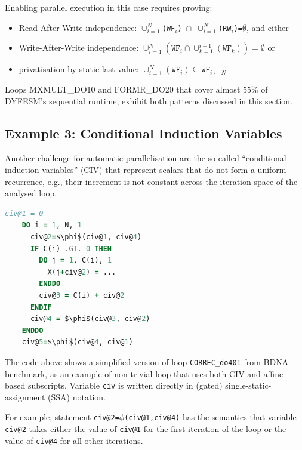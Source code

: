 Enabling parallel execution in this case requires proving:
\begin{itemize}
\item Read-After-Write independence: \texttt{$\cup_{i=1}^N$(WF$_i$)
    $\cap$ $\cup_{i=1}^{N}$(RW$_i$)=$\emptyset$}, and either
\item Write-After-Write independence:
  $\cup_{i=1}^{N}(\texttt{WF}_i \cap \cup_{k=1}^{i-1}(\texttt{WF}_k))=\emptyset$ or
\item privatisation by static-last value:
  $\cup_{i=1}^{N}(\texttt{WF}_i) \subseteq\texttt{WF}_{i\leftarrow N}$
\end{itemize}

Loops MXMULT\_DO10 and FORMR\_DO20 that cover almost $55\%$ of
DYFESM's sequential runtime, exhibit both patterns discussed in this
section.

\subsection{Example 3: Conditional Induction Variables}
\label{subsec:eg3}

Another challenge for automatic parallelisation are the so called
``conditional-induction variables'' (CIV) that represent scalars that
do not form a uniform recurrence, e.g., their increment is not
constant across the iteration space of the analysed loop.

\begin{lstlisting}[language=fortran,mathescape=true,escapechar=|]
    civ@1 = 0
    DO i = 1, N, 1
      civ@2=$\phi$(civ@1, civ@4)
      IF C(i) .GT. 0 THEN
        DO j = 1, C(i), 1
          X(j+civ@2) = ...
        ENDDO
        civ@3 = C(i) + civ@2
      ENDIF
      civ@4 = $\phi$(civ@3, civ@2)
    ENDDO
    civ@5=$\phi$(civ@4, civ@1)
\end{lstlisting}

The code above shows a simplified version of loop
\texttt{CORREC\_do401} from BDNA benchmark, as an example of
non-trivial loop that uses both CIV and affine-based subscripts.
Variable \texttt{civ} is written directly in (gated)
single-static-assignment (SSA) notation.

For example, statement \texttt{civ@2=$\phi$(civ@1,civ@4)} has the
semantics that variable \texttt{civ@2} takes either the value of
\texttt{civ@1} for the first iteration of the loop or the value of
\texttt{civ@4} for all other iterations.

